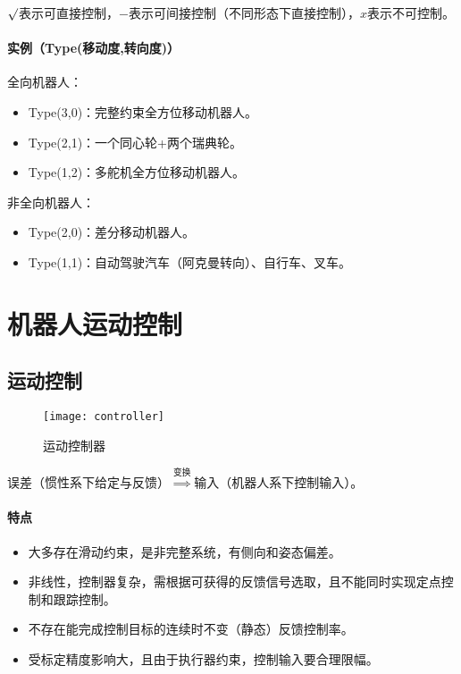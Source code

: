 \documentclass[
12pt, %
a4paper, 
oneside, %
headinclude,footinclude, %
]{scrartcl}
\begin{document}
$ \surd $表示可直接控制，$ - $表示可间接控制（不同形态下直接控制），$ x $表示不可控制。
\paragraph{实例（Type(移动度,转向度)）}
\begin{itemize}
\begin{minipage}{0.6\textwidth}
\item 全向机器人：
\begin{itemize}
\item Type(3,0)：完整约束全方位移动机器人。
\item Type(2,1)：一个同心轮+两个瑞典轮。
\item Type(1,2)：多舵机全方位移动机器人。
\end{itemize}
\end{minipage}
\begin{minipage}{0.4\textwidth}
\item 非全向机器人：
\begin{itemize}
\item Type(2,0)：差分移动机器人。
\item Type(1,1)：自动驾驶汽车（阿克曼转向）、自行车、叉车。
\end{itemize}
\end{minipage}
\end{itemize}
\section{机器人运动控制}
\subsection[运动控制]{运动控制}\label{sec:motion_control}
\begin{figure}[H]
\centering 
\texttt{[image: controller]} 
\caption{运动控制器}
\end{figure}

误差（惯性系下给定与反馈）$ \overset{\text{变换}}{\Longrightarrow} $输入（机器人系下控制输入）。 
\paragraph{特点}
\begin{itemize}
\item 大多存在滑动约束，是非完整系统，有侧向和姿态偏差。
\item 非线性，控制器复杂，需根据可获得的反馈信号选取，且不能同时实现定点控制和跟踪控制。
\item 不存在能完成控制目标的连续时不变（静态）反馈控制率。
\item 受标定精度影响大，且由于执行器约束，控制输入要合理限幅。
\end{itemize}
\end{document}

